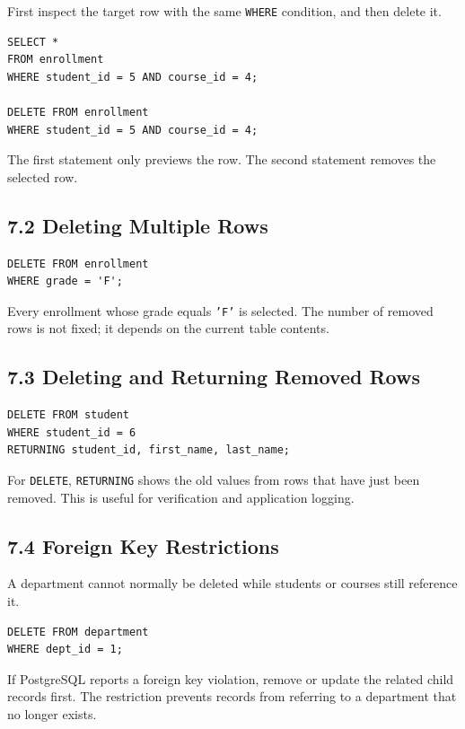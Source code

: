 \documentclass[12pt,a4paper]{article}
\begin{document}
First inspect the target row with the same \texttt{WHERE} condition, and then delete it.

\begin{verbatim}
SELECT *
FROM enrollment
WHERE student_id = 5 AND course_id = 4;

DELETE FROM enrollment
WHERE student_id = 5 AND course_id = 4;
\end{verbatim}

\noindent The first statement only previews the row. The second statement removes the selected row.

\subsection*{7.2 Deleting Multiple Rows}
\begin{verbatim}
DELETE FROM enrollment
WHERE grade = 'F';
\end{verbatim}

\noindent Every enrollment whose grade equals \texttt{'F'} is selected. The number of removed rows
is not fixed; it depends on the current table contents.

\subsection*{7.3 Deleting and Returning Removed Rows}
\begin{verbatim}
DELETE FROM student
WHERE student_id = 6
RETURNING student_id, first_name, last_name;
\end{verbatim}

\noindent For \texttt{DELETE}, \texttt{RETURNING} shows the old values from rows that have just
been removed. This is useful for verification and application logging.

\subsection*{7.4 Foreign Key Restrictions}
A department cannot normally be deleted while students or courses still reference it.

\begin{verbatim}
DELETE FROM department
WHERE dept_id = 1;
\end{verbatim}

If PostgreSQL reports a foreign key violation, remove or update the related child records first.
The restriction prevents records from referring to a department that no longer exists.
\end{document}
